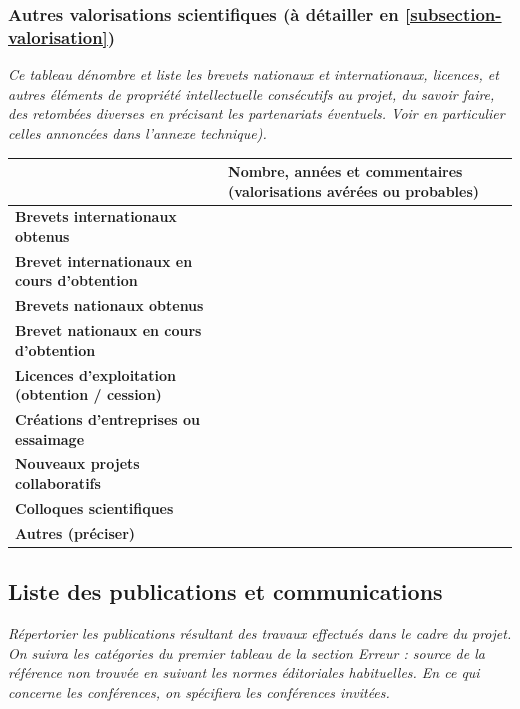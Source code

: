 \documentclass[a4paper,11pt]{article}
\newcommand{\tableheader}[1]{\textbf{\textcolor{ANRbleu}{#1}}}
\newcommand{\instructions}[1]{%
		{%
			\setlength{\parindent}{0cm}%
			{\em\color{ANRvert}#1}%
		}%
	}
\newcommand{\instructions}[1]{}
\begin{document}
\subsubsection{Autres valorisations scientifiques (à détailler en \cref{subsection-valorisation})}

\instructions{Ce tableau dénombre et liste les brevets nationaux et internationaux, licences, et autres éléments de propriété intellectuelle consécutifs au projet, du savoir faire, des retombées diverses en précisant les partenariats éventuels. Voir en particulier celles annoncées dans l'annexe technique). }


\noindent\begin{tabular}{| p{5cm} | p{11.5cm} |}
	\hline
	& \tableheader{Nombre, années et commentaires 
(valorisations avérées ou probables)} \\
	\hline
	\tableheader{Brevets internationaux obtenus} & \\
	\hline
	\tableheader{Brevet internationaux en cours d'obtention} & \\
	\hline
	\tableheader{Brevets nationaux obtenus} & \\
	\hline
	\tableheader{Brevet nationaux en cours d'obtention} & \\
	\hline
	\tableheader{Licences d'exploitation (obtention / cession)} & \\
	\hline
	\tableheader{Créations d'entreprises ou essaimage} & \\
	\hline
	\tableheader{Nouveaux projets collaboratifs} & \\
	\hline
	\tableheader{Colloques scientifiques} & \\
	\hline
	\tableheader{Autres (préciser)} & \\
	\hline
\end{tabular}



\subsection{Liste des publications et communications}\label{subsection-publications}

\instructions{Répertorier les publications résultant des travaux effectués dans le cadre du projet. On suivra les catégories du premier tableau de la section Erreur : source de la référence non trouvée en suivant les normes éditoriales habituelles. En ce qui concerne les conférences, on spécifiera les conférences invitées.}
\end{document}
